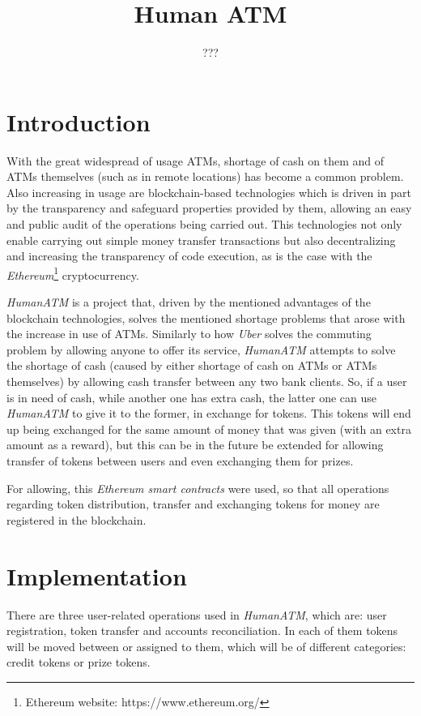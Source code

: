 \documentclass[a4paper]{article}
\title{Human ATM}
\author{???}
\begin{document}
\maketitle

\section{Introduction}

With the great widespread of usage ATMs, shortage of cash on them and of ATMs themselves (such as in remote locations) has become a common problem. Also increasing in usage are blockchain-based technologies which is driven in part by the transparency and safeguard properties provided by them, allowing an easy and public audit of the operations being carried out. This technologies not only enable carrying out simple money transfer transactions but also decentralizing and increasing the transparency of code execution, as is the case with the \textit{Ethereum}\footnote{Ethereum website: https://www.ethereum.org/} cryptocurrency.

\textit{HumanATM} is a project that, driven by the mentioned advantages of the blockchain technologies, solves the mentioned shortage problems that arose with the increase in use of ATMs. Similarly to how \textit{Uber} solves the commuting problem by allowing anyone to offer its service, \textit{HumanATM} attempts to solve the shortage of cash (caused by either shortage of cash on ATMs or ATMs themselves) by allowing cash transfer between any two bank clients. So, if a user is in need of cash, while another one has extra cash, the latter one can use \textit{HumanATM} to give it to the former, in exchange for tokens. This tokens will end up being exchanged for the same amount of money that was given (with an extra amount as a reward), but this can be in the future be extended for allowing transfer of tokens between users and even exchanging them for prizes.

For allowing, this \textit{Ethereum smart contracts} were used, so that all operations regarding token distribution, transfer and exchanging tokens for money are registered in the blockchain.

\section{Implementation}

There are three user-related operations used in \textit{HumanATM}, which are: user registration, token transfer and accounts reconciliation. In each of them tokens will be moved between or assigned to them, which will be of different categories: credit tokens or prize tokens.
\end{document}
